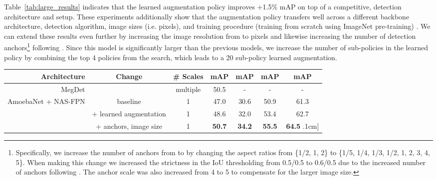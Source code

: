 \documentclass[10pt,twocolumn,letterpaper]{article}
\begin{document}
Table~\ref{tab:large_results} indicates that the learned augmentation policy improves
+1.5\% mAP on top of a competitive, detection architecture and setup. These experiments additionally show that the augmentation policy transfers well across a different backbone architecture, detection algorithm, image sizes (i.e.  pixels), and training procedure (training from scratch  using ImageNet pre-training) .
We can extend these results even further by increasing the image resolution from  to  pixels and likewise increasing the number of detection anchors\footnote{Specifically, we increase the number of anchors from  to  by changing the aspect ratios from \{1/2, 1, 2\} to \{1/5, 1/4, 1/3, 1/2, 1, 2, 3, 4, 5\}. When making this change we increased the strictness in the IoU thresholding from 0.5/0.5 to 0.6/0.5 due to the increased number of anchors following \cite{yang2018metaanchor}. The anchor scale was also increased from 4 to 5 to compensate for the larger image size.} following \cite{yang2018metaanchor}. Since this model is significantly larger than the previous models, we increase the number of sub-policies in the learned policy by combining the top 4 policies from the search, which leads to a 20 sub-policy learned augmentation. 


\begin{table*}[t]
\centering
\small
\begin{tabular}{r|c|c|c|ccc}
Architecture  & Change & \# Scales & mAP & mAP & mAP & mAP \\
  \toprule
  MegDet \cite{Peng_2018_CVPR} & & multiple & 50.5 & - & - & - \\
  \hline
  \multirow{3}{*}{AmoebaNet + NAS-FPN}  & baseline \cite{ghiasi2019NASFpn} & 1 & 47.0 & 30.6 & 50.9 & 61.3 \\
   & + learned augmentation & 1 & 48.6 & 32.0 & 53.4 & 62.7 \\
   & +  anchors,  image size & 1 & \textbf{50.7} & \textbf{34.2} & \textbf{55.5} & \textbf{64.5} \0.1cm]
\end{tabular}
\caption{\textbf{Exceeding state-of-the-art detection with learned augmentation policy.} Reporting mAP for COCO validation set. Previous state-of-the-art results for COCO detection evaluated a single image at multiple spatial scales to perform detection at test time~\cite{Peng_2018_CVPR}. Our current results only require a single inference computation at single spatial scale.
Backbone model is AmoebaNet-D \cite{real2018regularized} and the NAS-FPN detection system \cite{ghiasi2019NASFpn}. For the \textbf{50.7} result, in addition to using the learned data augmentation policy, we increase the image size from 1280 to 1536 and the number of detection anchors from 3x3 to 9x9.}
\label{tab:large_results}  
\end{table*}
\end{document}
